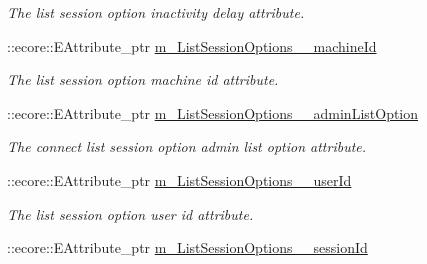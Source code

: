 \begin{DoxyCompactItemize}
\begin{DoxyCompactList}\small\item\em The list session option inactivity delay attribute. \item\end{DoxyCompactList}\item 
\hypertarget{classUMS__Data_1_1UMS__DataPackage_a5c5251564aad10a20628bdd475ad2366}{
::ecore::EAttribute\_\-ptr \hyperlink{classUMS__Data_1_1UMS__DataPackage_a5c5251564aad10a20628bdd475ad2366}{m\_\-ListSessionOptions\_\-\_\-machineId}}
\label{classUMS__Data_1_1UMS__DataPackage_a5c5251564aad10a20628bdd475ad2366}

\begin{DoxyCompactList}\small\item\em The list session option machine id attribute. \item\end{DoxyCompactList}\item 
\hypertarget{classUMS__Data_1_1UMS__DataPackage_a77eb09bc9bfc76b87cd211403dcb7ca2}{
::ecore::EAttribute\_\-ptr \hyperlink{classUMS__Data_1_1UMS__DataPackage_a77eb09bc9bfc76b87cd211403dcb7ca2}{m\_\-ListSessionOptions\_\-\_\-adminListOption}}
\label{classUMS__Data_1_1UMS__DataPackage_a77eb09bc9bfc76b87cd211403dcb7ca2}

\begin{DoxyCompactList}\small\item\em The connect list session option admin list option attribute. \item\end{DoxyCompactList}\item 
\hypertarget{classUMS__Data_1_1UMS__DataPackage_a2d2c8d86c80ad70de8625267eb564d21}{
::ecore::EAttribute\_\-ptr \hyperlink{classUMS__Data_1_1UMS__DataPackage_a2d2c8d86c80ad70de8625267eb564d21}{m\_\-ListSessionOptions\_\-\_\-userId}}
\label{classUMS__Data_1_1UMS__DataPackage_a2d2c8d86c80ad70de8625267eb564d21}

\begin{DoxyCompactList}\small\item\em The list session option user id attribute. \item\end{DoxyCompactList}\item 
\hypertarget{classUMS__Data_1_1UMS__DataPackage_a1fcc70054b1814759e5e493317c1848d}{
::ecore::EAttribute\_\-ptr \hyperlink{classUMS__Data_1_1UMS__DataPackage_a1fcc70054b1814759e5e493317c1848d}{m\_\-ListSessionOptions\_\-\_\-sessionId}}
\label{classUMS__Data_1_1UMS__DataPackage_a1fcc70054b1814759e5e493317c1848d}


\end{DoxyCompactItemize}
